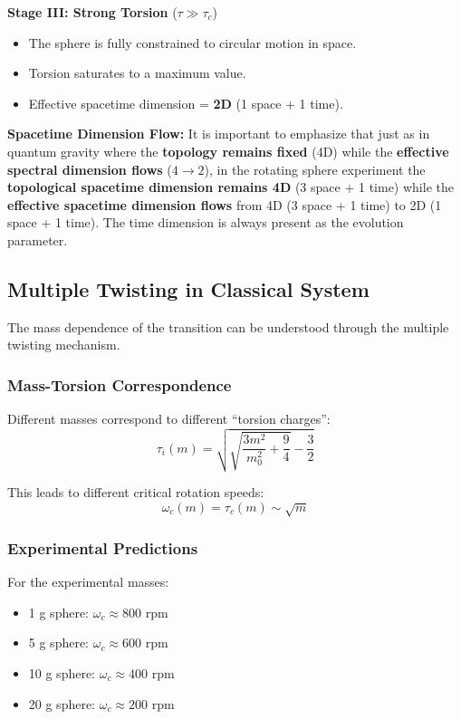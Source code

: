 \documentclass[12pt,a4paper]{article}
\begin{document}
\textbf{Stage III: Strong Torsion} ($\tau \gg \tau_c$)
\begin{itemize}
    \item The sphere is fully constrained to circular motion in space.
    \item Torsion saturates to a maximum value.
    \item Effective spacetime dimension = \textbf{2D} (1 space + 1 time).
\end{itemize}

\textbf{Spacetime Dimension Flow:} It is important to emphasize that just as in quantum gravity where the \textbf{topology remains fixed} (4D) while the \textbf{effective spectral dimension flows} ($4 \to 2$), in the rotating sphere experiment the \textbf{topological spacetime dimension remains 4D} (3 space + 1 time) while the \textbf{effective spacetime dimension flows} from 4D (3 space + 1 time) to 2D (1 space + 1 time). The time dimension is always present as the evolution parameter.

\subsection{Multiple Twisting in Classical System}

The mass dependence of the transition can be understood through the multiple twisting mechanism.

\subsubsection{Mass-Torsion Correspondence}

Different masses correspond to different ``torsion charges'':
\begin{equation}
    \tau_i(m) = \sqrt{\sqrt{\frac{3m^2}{m_0^2} + \frac{9}{4}} - \frac{3}{2}}
\end{equation}

This leads to different critical rotation speeds:
\begin{equation}
    \omega_c(m) = \tau_c(m) \sim \sqrt{m}
\end{equation}

\subsubsection{Experimental Predictions}

For the experimental masses:
\begin{itemize}
    \item 1 g sphere: $\omega_c \approx 800$ rpm
    \item 5 g sphere: $\omega_c \approx 600$ rpm  
    \item 10 g sphere: $\omega_c \approx 400$ rpm
    \item 20 g sphere: $\omega_c \approx 200$ rpm
\end{itemize}
\end{document}
